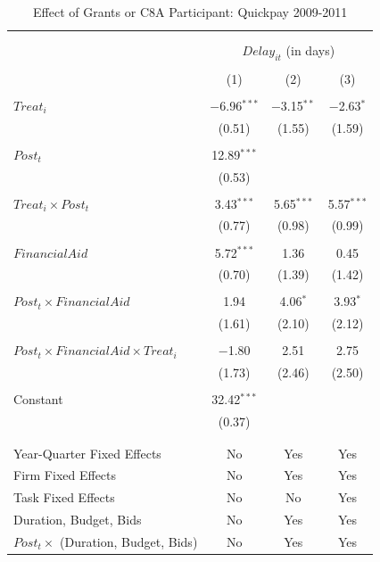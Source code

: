 \documentclass[
]{article}
\begin{document}
\begin{table}[H] \centering 
  \caption{Effect of Grants or C8A Participant: Quickpay 2009-2011} 
  \label{} 
\small 
\begin{tabular}{@{\extracolsep{-2pt}}lccc} 
\\[-1.8ex]\hline 
\hline \\[-1.8ex] 
\\[-1.8ex] & \multicolumn{3}{c}{$Delay_{it}$ (in days)} \\ 
\\[-1.8ex] & (1) & (2) & (3)\\ 
\hline \\[-1.8ex] 
 $Treat_i$ & $-$6.96$^{***}$ & $-$3.15$^{**}$ & $-$2.63$^{*}$ \\ 
  & (0.51) & (1.55) & (1.59) \\ 
  & & & \\ 
 $Post_t$ & 12.89$^{***}$ &  &  \\ 
  & (0.53) &  &  \\ 
  & & & \\ 
 $Treat_i \times Post_t$ & 3.43$^{***}$ & 5.65$^{***}$ & 5.57$^{***}$ \\ 
  & (0.77) & (0.98) & (0.99) \\ 
  & & & \\ 
 $FinancialAid$ & 5.72$^{***}$ & 1.36 & 0.45 \\ 
  & (0.70) & (1.39) & (1.42) \\ 
  & & & \\ 
 $Post_t \times FinancialAid$ & 1.94 & 4.06$^{*}$ & 3.93$^{*}$ \\ 
  & (1.61) & (2.10) & (2.12) \\ 
  & & & \\ 
 $Post_t \times FinancialAid \times Treat_i$ & $-$1.80 & 2.51 & 2.75 \\ 
  & (1.73) & (2.46) & (2.50) \\ 
  & & & \\ 
 Constant & 32.42$^{***}$ &  &  \\ 
  & (0.37) &  &  \\ 
  & & & \\ 
\hline \\[-1.8ex] 
Year-Quarter Fixed Effects & No & Yes & Yes \\ 
Firm Fixed Effects & No & Yes & Yes \\ 
Task Fixed Effects & No & No & Yes \\ 
Duration, Budget, Bids & No & Yes & Yes \\ 
$Post_t \times$  (Duration, Budget, Bids) & No & Yes & Yes \\ 

\end{tabular}
\end{table}
\end{document}
